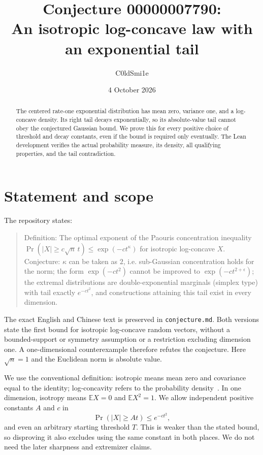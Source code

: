 \documentclass[11pt]{article}
\title{Conjecture 00000007790:\\An isotropic log-concave law with an exponential tail}
\author{C0ldSmi1e}
\date{4 October 2026}
\begin{document}
\maketitle
\begin{abstract}
The centered rate-one exponential distribution has mean zero, variance one, and a log-concave density. Its right tail decays exponentially, so its absolute-value tail cannot obey the conjectured Gaussian bound. We prove this for every positive choice of threshold and decay constants, even if the bound is required only eventually. The Lean development verifies the actual probability measure, its density, all qualifying properties, and the tail contradiction.
\end{abstract}

\section{Statement and scope}
The repository states:
\begin{quote}
Definition: The optimal exponent of the Paouris concentration inequality $\Pr(|X|\geq c\sqrt n\,t)\leq\exp(-ct^\kappa)$ for isotropic log-concave $X$. Conjecture: $\kappa$ can be taken as $2$, i.e. sub-Gaussian concentration holds for the norm; the form $\exp(-ct^2)$ cannot be improved to $\exp(-ct^{2+\epsilon})$; the extremal distributions are double-exponential marginals (simplex type) with tail exactly $e^{-ct^2}$, and constructions attaining this tail exist in every dimension.
\end{quote}
The exact English and Chinese text is preserved in \texttt{conjecture.md}. Both versions state the first bound for isotropic log-concave random vectors, without a bounded-support or symmetry assumption or a restriction excluding dimension one. A one-dimensional counterexample therefore refutes the conjecture. Here $\sqrt n=1$ and the Euclidean norm is absolute value.

We use the conventional definition: isotropic means mean zero and covariance equal to the identity; log-concavity refers to the probability density~\cite{gm}. In one dimension, isotropy means $\mathbb EX=0$ and $\mathbb EX^2=1$. We allow independent positive constants $A$ and $c$ in
\[
 \Pr(|X|\geq At)\leq e^{-ct^2},
\]
and even an arbitrary starting threshold $T$. This is weaker than the stated bound, so disproving it also excludes using the same constant in both places. We do not need the later sharpness and extremizer claims.
\end{document}
